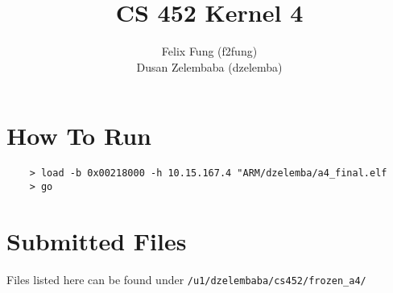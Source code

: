 \documentclass[letterpaper]{article}
\begin{document}
\title{CS 452 Kernel 4}
\author{Felix Fung (f2fung) \\ Dusan Zelembaba (dzelemba)}
\maketitle

\section{How To Run}
\begin{verbatim}
	> load -b 0x00218000 -h 10.15.167.4 "ARM/dzelemba/a4_final.elf
	> go
\end{verbatim}

\section{Submitted Files}

Files listed here can be found under \verb!/u1/dzelembaba/cs452/frozen_a4/!
\end{document}
